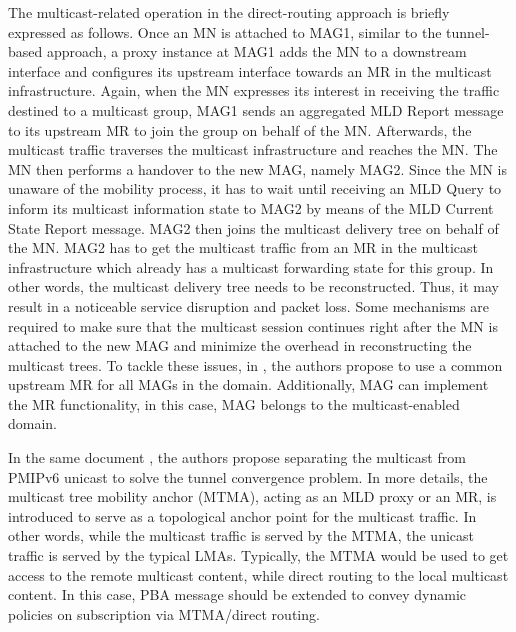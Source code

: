 The multicast-related operation in the direct-routing approach is briefly expressed as follows. Once an MN is attached to MAG1, similar to the tunnel-based approach, a proxy instance at MAG1 adds the MN to a downstream interface and configures its upstream interface towards an MR in the multicast infrastructure. Again, when the MN expresses its interest in receiving the traffic destined to a multicast group, MAG1 sends an aggregated MLD Report message to its upstream MR to join the group on behalf of the MN. Afterwards, the multicast traffic traverses the multicast infrastructure and reaches the MN. The MN then performs a handover to the new MAG, namely MAG2. Since the MN is unaware of the mobility process, it has to wait until receiving an MLD Query to inform its multicast information state to MAG2 by means of the MLD Current State Report message. MAG2 then joins the multicast delivery tree on behalf of the MN. MAG2 has to get the multicast traffic from an MR in the multicast infrastructure which already has a multicast forwarding state for this group. In other words, the multicast delivery tree needs to be reconstructed. Thus, it may result in a noticeable service disruption and packet loss. Some mechanisms are required to make sure that the multicast session continues right after the MN is attached to the new MAG and minimize the overhead in reconstructing the multicast trees. To tackle these issues, in \cite{direct_routing_mtma}, the authors propose to use a common upstream MR for all MAGs in the domain. Additionally, MAG can implement the MR functionality, in this case, MAG belongs to the multicast-enabled domain. 

In the same document \cite{direct_routing_mtma}, the authors propose separating the multicast from PMIPv6 unicast to solve the tunnel convergence problem. In more details, the multicast tree mobility anchor (MTMA), acting as an MLD proxy or an MR, is introduced to serve as a topological anchor point for the multicast traffic. In other words, while the multicast traffic is served by the MTMA, the unicast traffic is served by the typical LMAs. Typically, the MTMA would be used to get access to the remote multicast content, while direct routing to the local multicast content. In this case, PBA message should be extended to convey dynamic policies on subscription via MTMA/direct routing. 

